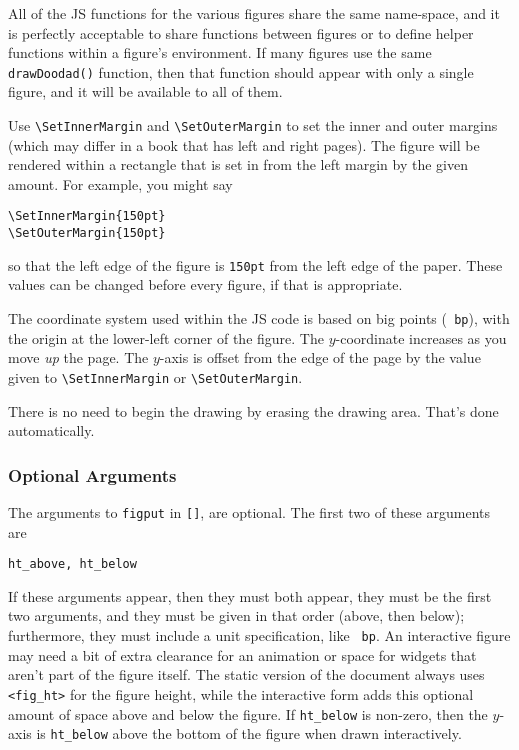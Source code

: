 \documentclass[10pt]{article}
\begin{document}
All of the JS functions for the various figures share the same
name-space, and it is perfectly acceptable to share functions between
figures or to define helper functions within a figure's
environment. If many figures use the same {\tt drawDoodad()}
function, then that function should appear with only a single figure, and
it will be available to all of them. 

Use \verb=\SetInnerMargin= and \verb=\SetOuterMargin= to set the inner and outer
margins (which may differ in a book that has left and right
pages). The figure will be rendered within a rectangle that is set in
from the left margin by the given amount. For example, you might say
\begin{verbatim}
\SetInnerMargin{150pt}
\SetOuterMargin{150pt}
\end{verbatim}
so that the left edge of the figure is {\tt 150pt} from the left edge
of the paper. These values can be changed before every figure, if that
is appropriate.

The coordinate system used within the JS code is based on big points ({\tt
  bp}), with the origin at the lower-left corner of the
figure. The $y$-coordinate increases as you move \emph{up} the page.
The $y$-axis is offset from the edge of the page by the
value given to \verb=\SetInnerMargin= or \verb=\SetOuterMargin=.

There is no need to begin the drawing by erasing the drawing
area. That's done automatically.

\subsubsection*{Optional Arguments}

The arguments to {\tt figput} in {\tt []}, are optional. The first two
of these arguments are \label{ht-above-below}
\begin{verbatim}
ht_above, ht_below 
\end{verbatim}
If these arguments appear, then they must both appear, they must be
the first two arguments, and they must be given in that order (above,
then below); furthermore, they must include a unit specification, like {\tt
  bp}. An interactive figure may need a bit of extra clearance 
for an animation or space for widgets that aren't part of the
figure itself. The static version of the document always uses
\verb=<fig_ht>= for the figure height, while the interactive form adds
this optional amount of space above and below the figure. If
\verb=ht_below= is non-zero, then the $y$-axis is \verb=ht_below=
above the bottom of the figure when drawn interactively.
\end{document}
